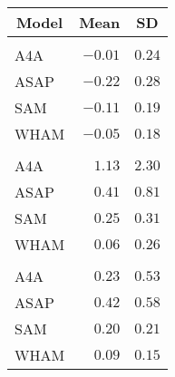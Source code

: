 \begin{center}
\begin{tabular}{lrr}
\toprule
\multicolumn{1}{c}{Model}&\multicolumn{1}{c}{Mean}&\multicolumn{1}{c}{SD}\tabularnewline
\midrule
&&\tabularnewline
A4A&$-0.01$&$0.24$\tabularnewline
ASAP&$-0.22$&$0.28$\tabularnewline
SAM&$-0.11$&$0.19$\tabularnewline
WHAM&$-0.05$&$0.18$\tabularnewline
\midrule
&&\tabularnewline
A4A&$ 1.13$&$2.30$\tabularnewline
ASAP&$ 0.41$&$0.81$\tabularnewline
SAM&$ 0.25$&$0.31$\tabularnewline
WHAM&$ 0.06$&$0.26$\tabularnewline
\midrule
&&\tabularnewline
A4A&$ 0.23$&$0.53$\tabularnewline
ASAP&$ 0.42$&$0.58$\tabularnewline
SAM&$ 0.20$&$0.21$\tabularnewline
WHAM&$ 0.09$&$0.15$\tabularnewline
\bottomrule
\end{tabular}\end{center}
